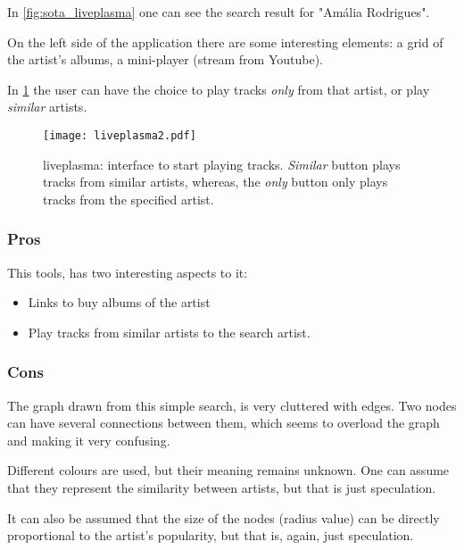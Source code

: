     In \ref{fig:sota_liveplasma} one can see the search result for "Amália Rodrigues".

    On the left side of the application there are some interesting elements: a grid of the artist's albums, a mini-player (stream from Youtube).

    In \ref{fig:sota_liveplasma2} the user can have the choice to play tracks \emph{only} from that artist, or play \emph{similar} artists.

    \begin{figure}[b]
      \begin{center}
        \texttt{[image: liveplasma2.pdf]}
      \end{center}
      \caption{liveplasma: interface to start playing tracks. \emph{Similar} button plays tracks from similar artists, whereas, the \emph{only} button only plays tracks from the specified artist.}
      \label{fig:sota_liveplasma2}
    \end{figure}

    \subsubsection{Pros} %
    \label{ssub:liveplasma_pros}

      This tools, has two interesting aspects to it:

      \begin{itemize}
        \item Links to buy albums of the artist
        \item Play tracks from similar artists to the search artist.
      \end{itemize}


    \subsubsection{Cons} %
    \label{ssub:liveplasma_cons}

      The graph drawn from this simple search, is very cluttered with edges.
      Two nodes can have several connections between them, which seems to overload the graph and making it very confusing.

      Different colours are used, but their meaning remains unknown. One can assume that they represent the similarity between artists, but that is just speculation.

      It can also be assumed that the size of the nodes (radius value) can be directly proportional to the artist's popularity, but that is, again, just speculation.

